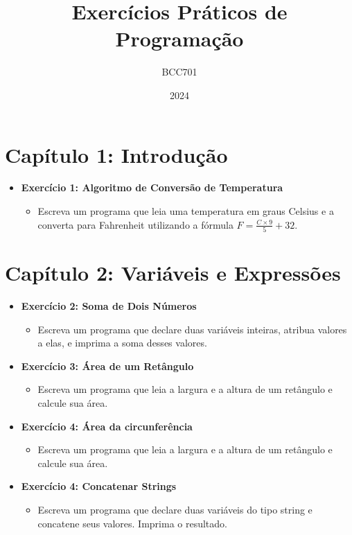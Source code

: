 \documentclass{article}
\title{Exercícios Práticos de Programação}
\author{BCC701}
\date{2024}
\begin{document}
\maketitle

\section*{Capítulo 1: Introdução}
\begin{itemize}
    \item \textbf{Exercício 1: Algoritmo de Conversão de Temperatura}
    \begin{itemize}
        \item Escreva um programa que leia uma temperatura em graus Celsius e a converta para Fahrenheit utilizando a fórmula \( F = \frac{C \times 9}{5} + 32 \).
    \end{itemize}
\end{itemize}

\section*{Capítulo 2: Variáveis e Expressões}
\begin{itemize}
    \item \textbf{Exercício 2: Soma de Dois Números}
    \begin{itemize}
        \item Escreva um programa que declare duas variáveis inteiras, atribua valores a elas, e imprima a soma desses valores.
    \end{itemize}
    \item \textbf{Exercício 3: Área de um Retângulo}
    \begin{itemize}
        \item Escreva um programa que leia a largura e a altura de um retângulo e calcule sua área.
    \end{itemize}
    \item \textbf{Exercício 4: Área da circunferência}
    \begin{itemize}
        \item Escreva um programa que leia a largura e a altura de um retângulo e calcule sua área.
    \end{itemize}
    \item \textbf{Exercício 4: Concatenar Strings}
    \begin{itemize}
        \item Escreva um programa que declare duas variáveis do tipo string e concatene seus valores. Imprima o resultado.
    \end{itemize}
\end{itemize}
\end{document}
